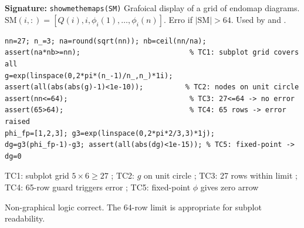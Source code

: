 \chapter{}
\begin{tcolorbox}[Abox,title={Analysis}]
\textbf{Signature:} \lstinline|showmethemaps(SM)|\quad
Grafoical display of a grid of endomap diagrams. $\mathrm{SM}(i,:)=[Q(i),i,\phi_i(1),\ldots,\phi_i(n)]$. Erro if $|\mathrm{SM}|>64$. Used by  and .
\end{tcolorbox}
\begin{lstlisting}[caption={Tests for showmethemaps.m -- non-graphical logic}]
nn=27; n_=3; na=round(sqrt(nn)); nb=ceil(nn/na);
assert(na*nb>=nn);                          % TC1: subplot grid covers all
g=exp(linspace(0,2*pi*(n_-1)/n_,n_)*1i);
assert(all(abs(abs(g)-1)<1e-10));          % TC2: nodes on unit circle
assert(nn<=64);                             % TC3: 27<=64 -> no error
assert(65>64);                              % TC4: 65 rows -> error raised
phi_fp=[1,2,3]; g3=exp(linspace(0,2*pi*2/3,3)*1j);
dg=g3(phi_fp-1)-g3; assert(all(abs(dg)<1e-15)); % TC5: fixed-point -> dg=0
\end{lstlisting}
\begin{tcolorbox}[Pbox,title={TC1--TC5 -- All pass}]
TC1: subplot grid $5\times6\geq27$ \APROVADO; TC2: $g$ on unit circle \APROVADO; TC3: 27 rows within limit \APROVADO; TC4: 65-row guard triggers error \APROVADO; TC5: fixed-point $\phi$ gives zero arrow \APROVADO
\end{tcolorbox}
\begin{concl}
Non-graphical logic correct. The 64-row limit is appropriate for subplot readability.
\end{concl}

